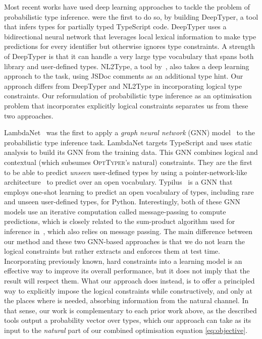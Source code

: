 \documentclass[acmsmall, review, anonymous]{acmart}\settopmatter{printfolios=true,printccs=false,printacmref=false}
\newcommand{\projectname}{\textsc{OptTyper}\xspace}
\begin{document}
Most recent works have used deep learning approaches to tackle
the problem of probabilistic type inference.
\citet{hellendoorn18} were the first to do so, by building 
DeepTyper, a tool that infers types for partially typed TypeScript code. DeepTyper uses a bidirectional neural network that leverages local lexical information to make type predictions for every identifier but otherwise ignores type constraints. 
A strength of DeepTyper is that it can handle a very large type vocabulary that spans both library and user-defined types.
NL2Type, a tool by~\cite{malik19}, also takes
a deep learning approach to the task, using JSDoc comments as an additional type hint.
Our approach differs from DeepTyper and NL2Type in  incorporating logical type constraints.
Our reformulation of probabilistic type inference as an optimisation problem that incorporates explicitly logical constraints separates us from these two approaches.

LambdaNet~\citep{wei20} was the first to apply a \emph{graph neural network} (GNN) model~\citep{Gilmer2017-qd,allamanis17a} to the probabilistic type inference task.
LambdaNet targets TypeScript and uses static analysis to build its GNN from the training data. 
This GNN combines logical and contextual (which subsumes \projectname's natural) constraints.
They are the first to be able to predict \emph{unseen} user-defined types by using a pointer-network-like architecture~\citep{vinyals15,Allamanis2016-su} to predict over an open vocabulary.
Typilus~\citep{allamanis20} is a GNN that employs one-shot learning to predict an open vocabulary of types, including rare and unseen user-defined types, for Python. 
Interestingly, both of these GNN models use an iterative
computation called message-passing to compute predictions,
which is closely related to the sum-product algorithm
used for inference in~\cite{xu16}, which also relies on message passing.
The main difference between our method and these two GNN-based approaches is that we do not learn the logical constraints but rather extracts and enforces them at test time.
Incorporating previously known, hard constraints into a learning
model is an effective way to improve its overall performance, but it does not imply that the result will respect them. What our approach does instead, is to offer a principled way to explicitly impose the logical constraints while constructively, 
and only at the places where is needed, absorbing information from the natural channel. In that sense, our work is complementary to each prior work above, as the described tools output
a probability vector over types, which our approach can take as its input to the
\textit{natural} part of our combined optimisation equation \eqref{eq:objective}.
\end{document}
